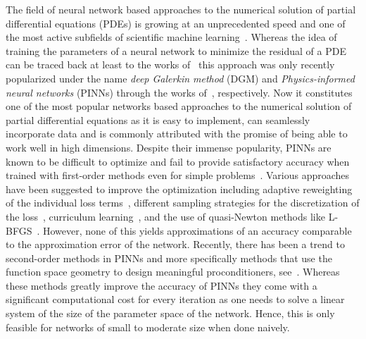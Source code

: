 
The field of neural network based approaches to the numerical solution of partial differential equations (PDEs) is growing at an unprecedented speed and one of the most active subfields of scientific machine learning~\cite{?}. 
Whereas the idea of training the parameters of a neural network to minimize the residual of a PDE can be traced back at least to the works of~\cite{dissanayake1994neural, lagaris1998artificial} this approach was only recently popularized under the name \emph{deep Galerkin method} (DGM) and \emph{Physics-informed neural networks} (PINNs) through the works of~\cite{sirignano2018dgm, raissi2019physics}, respectively.  
Now it constitutes one of the most popular networks based approaches to the numerical solution of partial differential equations as it is easy to implement, can seamlessly incorporate data and is commonly attributed with the promise of being able to work well in high dimensions. 
Despite their immense popularity, PINNs are known to be difficult to optimize and fail to provide satisfactory accuracy when trained with first-order methods even for simple problems~\cite{?}. 
Various approaches have been suggested to improve the optimization including adaptive reweighting of the individual loss terms~\citep{wang2021understanding,van2022optimally,wang2022and}, different sampling strategies for the discretization of the loss~\citep{lu2021deepxde, nabian2021efficient, daw2022rethinking,zapf2022investigating, wang2022respecting, wu2023comprehensive}, curriculum learning~\citep{wang2022respecting, krishnapriyan2021characterizing}, and the use of quasi-Newton methods like L-BFGS~\citep{markidis2021old}. 
However, none of this yields approximations of an accuracy comparable to the approximation error of the network. 
Recently, there has been a trend to second-order methods in PINNs and more specifically methods that use the function space geometry to design meaningful proconditioners, see~\citep{zeng2022competitive, muller2023achieving, de2023operator, liu2024preconditioning}. 
Whereas these methods greatly improve the accuracy of PINNs they come with a significant computational cost for every iteration as one needs to solve a linear system of the size of the parameter space of the network. 
Hence, this is only feasible for networks of small to moderate size when done naively.


